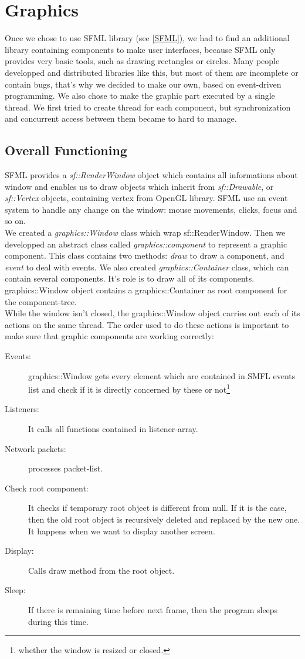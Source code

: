 \documentclass{scrreprt}
\begin{document}
		\chapter{Graphics}
		Once we chose to use SFML library (see \ref{SFML}), we had to find an additional library containing components to make user interfaces, because SFML only provides very basic tools, such as drawing rectangles or circles. Many people developped and distributed libraries like this, but most of them are incomplete or contain bugs, that's why we decided to make our own, based on event-driven programming. We also chose to make the graphic part executed by a single thread. We first tried to create thread for each component, but synchronization and concurrent access between them became to hard to manage.

		\section{Overall Functioning} %
		SFML provides a \emph{sf::RenderWindow} object which contains all informations about window and enables us to draw objects which inherit from \emph{sf::Drawable}, or \emph{sf::Vertex} objects, containing vertex from OpenGL library. SFML use an event system to handle any change on the window: mouse movements, clicks, focus and so on.\\

		We created a \emph{graphics::Window} class which wrap sf::RenderWindow. Then we developped an abstract class called \emph{graphics::component} to represent a graphic component. This class contains two methods: \emph{draw} to draw a component, and \emph{event} to deal with events.
		We also created \emph{graphics::Container} class, which can contain several components. It's role is to draw all of its components. graphics::Window object contains a graphics::Container as root component for the component-tree.\\

		While the window isn't closed, the graphics::Window object carries out each of its actions on the same thread. The order used to do these actions is important to make sure that graphic components are working correctly:
		\begin{description}
		\item[Events:]{graphics::Window gets every element which are contained in SMFL events list and check if it is directly concerned by these or not\footnote{whether the window is resized or closed.}}
		\item[Listeners:]{It calls all functions contained in listener-array.}
		\item[Network packets:]{processes packet-list.}
		\item[Check root component:] It checks if temporary root object is different from null. If it is the case, then the old root object is recursively deleted and replaced by the new one. It happens when we want to display another screen.
		\item[Display:]{Calls draw method from the root object.}
		\item[Sleep:]{If there is remaining time before next frame, then the program sleeps during this time.}
		\end{description}
\end{document}
